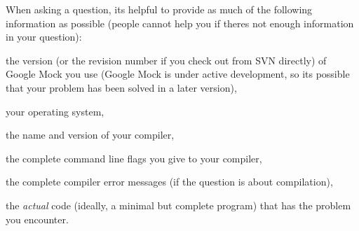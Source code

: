 When asking a question, it\textquotesingle{}s helpful to provide as much of the following information as possible (people cannot help you if there\textquotesingle{}s not enough information in your question)\+:


\begin{DoxyItemize}
\item the version (or the revision number if you check out from S\+VN directly) of Google Mock you use (Google Mock is under active development, so it\textquotesingle{}s possible that your problem has been solved in a later version),
\item your operating system,
\item the name and version of your compiler,
\item the complete command line flags you give to your compiler,
\item the complete compiler error messages (if the question is about compilation),
\item the {\itshape actual} code (ideally, a minimal but complete program) that has the problem you encounter. 
\end{DoxyItemize}